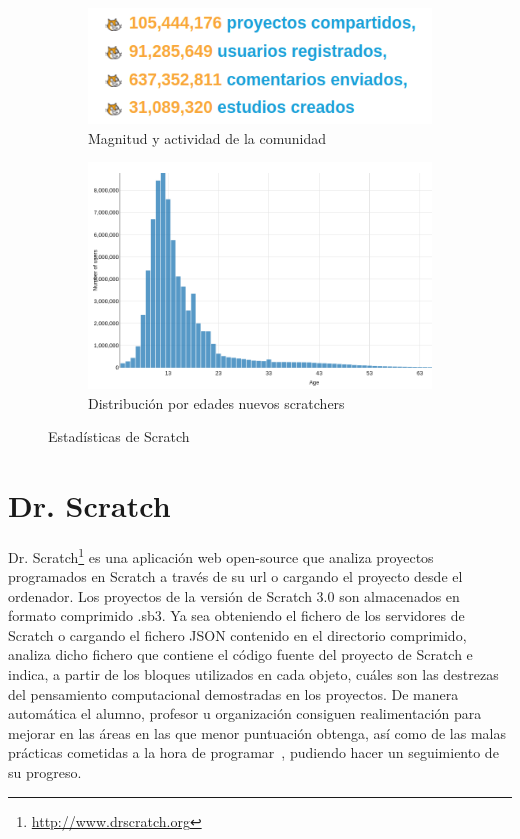\documentclass[a4paper, 12pt]{book}
\begin{document}
\begin{figure}[H]
    \centering
    \begin{subfigure}[h]{.49\textwidth} 
        \includegraphics[width=\textwidth]{img/estad_Scratch}
        \caption{Magnitud y actividad de la comunidad}
        \label{fig:estad}
    \end{subfigure}       
    \begin{subfigure}[h]{.49\textwidth} 
        \includegraphics[width=\textwidth]{img/edades_Scratch}
        \caption{Distribución por edades nuevos scratchers}
        \label{fig:edades}
    \end{subfigure}
     \caption{Estadísticas de Scratch}
\end{figure} 

\section{Dr. Scratch}
\label{sec:dr_scratch}

Dr. Scratch\footnote{\url{http://www.drscratch.org}} es una aplicación web open-source que analiza proyectos programados en Scratch a través de su url o cargando el proyecto desde el ordenador. Los proyectos de la versión de Scratch 3.0 son almacenados en formato comprimido .sb3. Ya sea obteniendo el fichero de los servidores de Scratch o cargando el fichero JSON contenido en el directorio comprimido, analiza dicho fichero que contiene el código fuente del proyecto de Scratch e indica, a partir de los bloques utilizados en cada objeto, cuáles son las destrezas del pensamiento computacional demostradas en los proyectos. De manera automática el alumno, profesor u organización consiguen realimentación para mejorar en las áreas en las que menor puntuación obtenga, así como de las malas prácticas cometidas a la hora de programar~\cite{moreno2015dr, vargas2019bad}, pudiendo hacer un seguimiento de su progreso.
\end{document}
